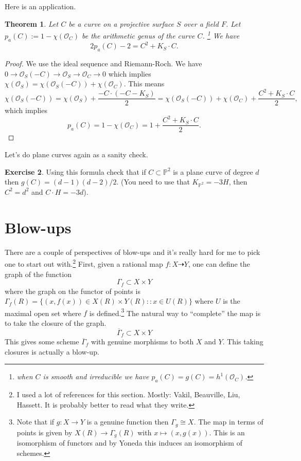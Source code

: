 \documentclass[12pt]{article}
\numberwithin{equation}{section}
\newtheorem{theorem}{Theorem}[subsection]
\theoremstyle{definition}
\newtheorem{exercise}[theorem]{Exercise}
\theoremstyle{remark}
\newcommand{\Ocal}{\mathcal{O}}
\newcommand{\PP}{\mathbb{P}}
\begin{document}
Here is an application. 

\begin{theorem}
	Let $C$ be a curve on a projective surface $S$ over a field $F$.
	Let $p_a(C) := 1 -\chi(\Ocal_C)$ be the arithmetic genus of the curve $C$. \footnote{when $C$ is smooth and irreducible we have $p_a(C)=g(C) = h^1(\Ocal_C)$.}
	We have 
	 $$ 2p_a(C)-2 =  C^2 + K_S \cdot C.$$
\end{theorem}
\begin{proof}
	We use the ideal sequence and Riemann-Roch. 
	We have $0\to \Ocal_S(-C) \to \Ocal_S \to \Ocal_C \to 0$ which implies $\chi(\Ocal_S) = \chi(\Ocal_S(-C)) + \chi(\Ocal_C)$. 
	This means 
$$\chi(\Ocal_S(-C)) = \chi(\Ocal_S) + \frac{-C\cdot(-C-K_S)}{2}= \chi(\Ocal_S(-C)) + \chi(\Ocal_C) + \frac{C^2+K_S\cdot C}{2}, $$
	which implies 
	$$p_a(C) = 1-\chi(\Ocal_C) = 1 + \frac{C^2+K_S\cdot C}{2}.$$
\end{proof}

Let's do plane curves again as a sanity check.
\begin{exercise}
	Using this formula check that if $C\subset \PP^2$ is a plane curve of degree $d$ then $g(C) = (d-1)(d-2)/2$. (You need to use that $K_{\PP^2} = -3H$, then $C^2=d^2$ and $C\cdot H = -3d$).
\end{exercise}



\section{Blow-ups}

There are a couple of perspectives of blow-ups and it's really hard for me to pick one to start out with.\footnote{I used a lot of references for this section. Mostly: Vakil, Beauville, Liu, Hassett. It is probably better to read what they write. }
First, given a rational map $f:X \dashrightarrow Y$, one can define the graph of the function 
 $$ \Gamma_f \subset X\times Y $$
where the graph on the functor of points is $\Gamma_f(R) = \lbrace (x,f(x)) \in X(R) \times Y(R) \colon: x \in U(R) \rbrace$ where $U$ is the maximal open set where $f$ is defined.\footnote{Note that if $g:X\to Y$ is a genuine function then $\Gamma_g \cong X$. 
	The map in terms of points is given by $X(R)\to \Gamma_g(R)$ with $x\mapsto (x,g(x))$. 
	This is an isomorphism of functors and by Yoneda this induces an isomorphism of schemes.
}
The natural way to ``complete'' the map is to take the closure of the graph. 
 $$ \overline{\Gamma}_f \subset X \times Y$$
This gives some scheme $\overline{\Gamma}_f$ with genuine morphisms to both $X$ and $Y$. 
This taking closures is actually a blow-up. 
 
\end{document}
